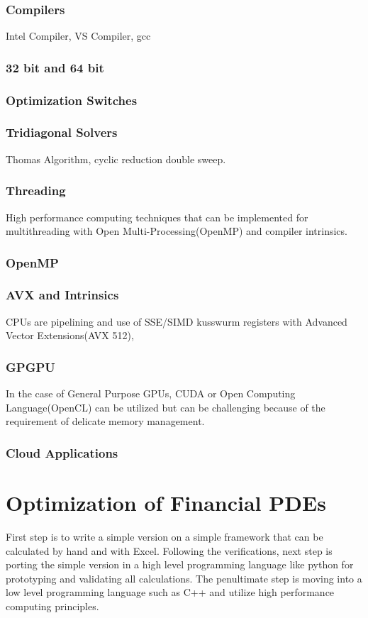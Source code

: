 \documentclass[12pt, oneside]{book}
\theoremstyle{plain}
\theoremstyle{definition}
\begin{document}
\subsection{Compilers}
Intel Compiler, VS Compiler, gcc

\subsection{32 bit and 64 bit}

\subsection{Optimization Switches}

\subsection{Tridiagonal Solvers}
Thomas Algorithm, cyclic reduction double sweep.
\subsection{Threading}
High performance computing techniques that can be implemented for multithreading with Open Multi-Processing(OpenMP) and compiler intrinsics.
\subsection{OpenMP}
\subsection{AVX and Intrinsics}
CPUs are pipelining and use of SSE/SIMD kusswurm registers with Advanced Vector Extensions(AVX 512),
\subsection{GPGPU}
 In the case of General Purpose GPUs, CUDA or Open Computing Language(OpenCL) can be utilized but can be challenging because of the requirement of delicate memory management.

\subsection{Cloud Applications}

\chapter{Optimization of Financial PDEs}
First step is to write a simple version on a simple framework that can be calculated by hand and with Excel. Following the verifications, next step is porting the simple version in a high level programming language like python for prototyping and validating all calculations. The penultimate step is moving into a low level programming language such as C++ and utilize high performance computing principles.
\end{document}
